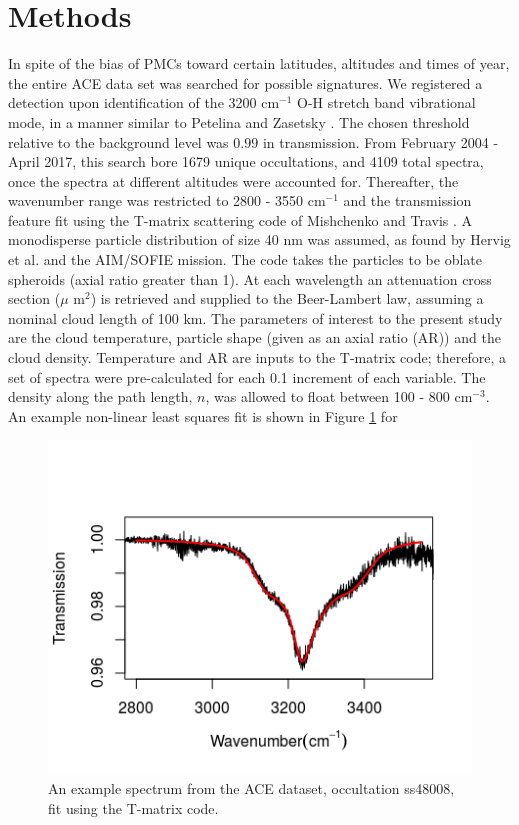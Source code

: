 \documentclass[]{elsarticle}
\begin{document}
\section{Methods} \label{sec:methods}
In spite of the bias of PMCs toward certain latitudes, altitudes and times of year, the entire ACE data set was searched for possible signatures. We registered a detection upon identification of the 3200 cm$^{-1}$ O-H stretch band vibrational mode, in a manner similar to Petelina and Zasetsky \cite{Petelina2009} \cite{Petelina2011}. The chosen threshold relative to the background level was $0.99$ in transmission. From February 2004 - April 2017, this search bore 1679 unique occultations, and 4109 total spectra, once the spectra at different altitudes were accounted for. Thereafter, the wavenumber range was restricted to 2800 - 3550 cm$^{-1}$ and the transmission feature fit using the T-matrix scattering code of Mishchenko and Travis \cite{Mishchenko1998}.  A monodisperse particle distribution of size 40 nm was assumed, as found by Hervig et al. \cite{Hervig2009} and the AIM/SOFIE mission. The code takes the particles to be oblate spheroids (axial ratio greater than 1). At each wavelength an attenuation cross section ($\mu$ m$^{2}$) is retrieved and supplied to the Beer-Lambert law, assuming a nominal cloud length of 100 km. 
The parameters of interest to the present study are the cloud temperature, particle shape (given as an axial ratio (AR)) and the cloud density. Temperature and AR are inputs to the T-matrix code; therefore, a set of spectra were pre-calculated for each 0.1 increment of each variable. The density along the path length, $n$, was allowed to float between 100 - 800 cm$^{-3}$. An example non-linear least squares fit is shown in Figure \ref{fig:Fig1} for 
\begin{figure}
	\includegraphics{figs/exSpec}
	\caption{An example spectrum from the ACE dataset, occultation ss48008, fit using the T-matrix code.}
	\label{fig:Fig1}
\end{figure}
\end{document}
